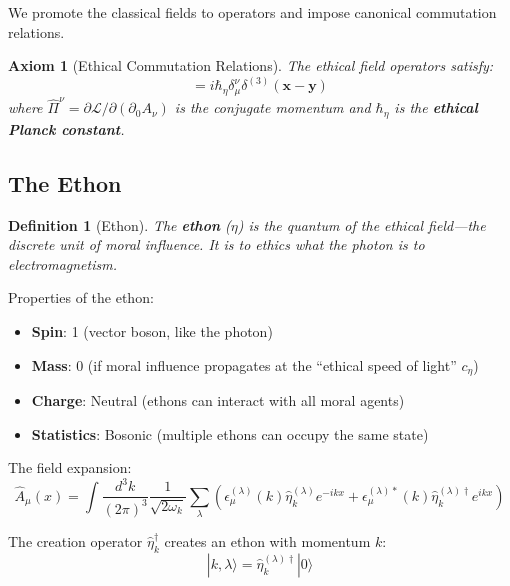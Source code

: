 \documentclass[12pt]{article}
\newtheorem{definition}{Definition}[section]
\newtheorem{axiom}{Axiom}
\begin{document}
We promote the classical fields to operators and impose canonical commutation relations.

\begin{axiom}[Ethical Commutation Relations]
The ethical field operators satisfy:
\begin{equation}
    [\hat{A}_\mu(x), \hat{\Pi}^\nu(y)] = i\hbar_\eta \delta_\mu^\nu \delta^{(3)}(\mathbf{x} - \mathbf{y})
\end{equation}
where $\hat{\Pi}^\nu = \partial\mathcal{L}/\partial(\partial_0 A_\nu)$ is the conjugate momentum and $\hbar_\eta$ is the \textbf{ethical Planck constant}.
\end{axiom}

\subsection{The Ethon}

\begin{definition}[Ethon]
The \textbf{ethon} ($\eta$) is the quantum of the ethical field---the discrete unit of moral influence. It is to ethics what the photon is to electromagnetism.
\end{definition}

Properties of the ethon:

\begin{itemize}
    \item \textbf{Spin}: 1 (vector boson, like the photon)
    \item \textbf{Mass}: 0 (if moral influence propagates at the ``ethical speed of light'' $c_\eta$)
    \item \textbf{Charge}: Neutral (ethons can interact with all moral agents)
    \item \textbf{Statistics}: Bosonic (multiple ethons can occupy the same state)
\end{itemize}

The field expansion:
\begin{equation}
    \hat{A}_\mu(x) = \int \frac{d^3k}{(2\pi)^3} \frac{1}{\sqrt{2\omega_k}} \sum_\lambda \left( \epsilon_\mu^{(\lambda)}(k) \hat{\eta}_k^{(\lambda)} e^{-ikx} + \epsilon_\mu^{(\lambda)*}(k) \hat{\eta}_k^{(\lambda)\dagger} e^{ikx} \right)
\end{equation}

The creation operator $\hat{\eta}_k^\dagger$ creates an ethon with momentum $k$:
\begin{equation}
    |k, \lambda\rangle = \hat{\eta}_k^{(\lambda)\dagger} |0\rangle
\end{equation}
\end{document}
